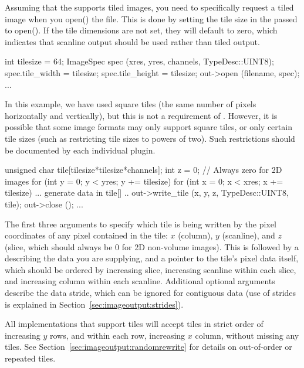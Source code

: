 Assuming that the \ImageOutput supports tiled images, you need to
specifically request a tiled image when you {\kw open()} the file.  This
is done by setting the tile size in the \ImageSpec passed
to {\kw open()}.  If the tile dimensions are not set, they will default
to zero, which indicates that scanline output should be used rather than
tiled output.

\begin{code}
        int tilesize = 64;
        ImageSpec spec (xres, yres, channels, TypeDesc::UINT8);
        spec.tile_width = tilesize;
        spec.tile_height = tilesize;
        out->open (filename, spec);
        ...
\end{code}

In this example, we have used square tiles (the same number of pixels
horizontally and vertically), but this is not a requirement of \product.
However, it is possible that some image formats may only support square
tiles, or only certain tile sizes (such as restricting tile sizes to
powers of two).  Such restrictions should be documented by each
individual plugin.

\begin{code}
        unsigned char tile[tilesize*tilesize*channels];
        int z = 0;   // Always zero for 2D images
        for (int y = 0;  y < yres;  y += tilesize) {
            for (int x = 0;  x < xres;  x += tilesize) {
                ... generate data in tile[] ..
                out->write_tile (x, y, z, TypeDesc::UINT8, tile);
            }
        }
        out->close ();
        ...
\end{code}

The first three arguments to \writetile specify which tile is
being written by the pixel coordinates of any pixel contained in the
tile: $x$ (column), $y$ (scanline), and $z$ (slice, which should always
be 0 for 2D non-volume images).  This is followed by a \TypeDesc
describing the data you are supplying, and a pointer to the tile's pixel
data itself, which should be ordered by increasing slice, increasing
scanline within each slice, and increasing column within each scanline.
Additional optional arguments describe the data stride, which can be
ignored for contiguous data (use of strides is explained in
Section~\ref{sec:imageoutput:strides}).

All \ImageOutput implementations that support tiles will accept tiles in
strict order of increasing $y$ rows, and within each row, increasing $x$
column, without missing any tiles.  See
Section~\ref{sec:imageoutput:randomrewrite} for details on out-of-order
or repeated tiles.

